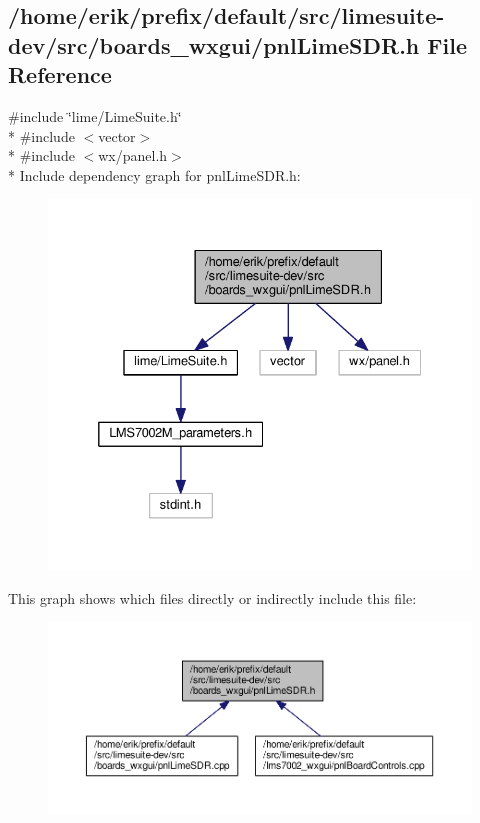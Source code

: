 \subsection{/home/erik/prefix/default/src/limesuite-\/dev/src/boards\+\_\+wxgui/pnl\+Lime\+S\+DR.h File Reference}
\label{pnlLimeSDR_8h}
{\ttfamily \#include \char`\"{}lime/\+Lime\+Suite.\+h\char`\"{}}\\*
{\ttfamily \#include $<$vector$>$}\\*
{\ttfamily \#include $<$wx/panel.\+h$>$}\\*
Include dependency graph for pnl\+Lime\+S\+D\+R.\+h\+:
\nopagebreak
\begin{figure}[H]
\begin{center}
\leavevmode
\includegraphics[width=332pt]{d8/dde/pnlLimeSDR_8h__incl}
\end{center}
\end{figure}
This graph shows which files directly or indirectly include this file\+:
\nopagebreak
\begin{figure}[H]
\begin{center}
\leavevmode
\includegraphics[width=350pt]{d0/dd2/pnlLimeSDR_8h__dep__incl}
\end{center}
\end{figure}
